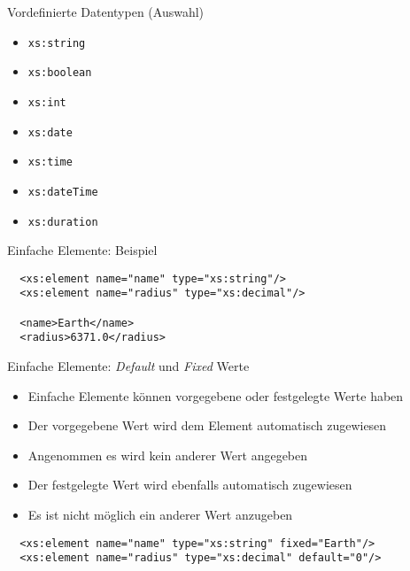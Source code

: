 \documentclass{beamer}
\begin{document}
\begin{frame}{Vordefinierte Datentypen (Auswahl)}
	
	\begin{itemize}
		\item \texttt{xs:string}
		\item \texttt{xs:boolean}
		\item \texttt{xs:int}
		\item \texttt{xs:date}
		\item \texttt{xs:time}
		\item \texttt{xs:dateTime}
		\item \texttt{xs:duration}
	\end{itemize}
	
\end{frame}

\begin{frame}[fragile]{Einfache Elemente: Beispiel}
	
	\lstset{language=XML}
	\begin{lstlisting}	
  <xs:element name="name" type="xs:string"/>
  <xs:element name="radius" type="xs:decimal"/>
  
  <name>Earth</name>
  <radius>6371.0</radius>
	\end{lstlisting}
	
\end{frame}

\begin{frame}[fragile]{Einfache Elemente: \emph{Default} und \emph{Fixed} Werte}
	
	\begin{itemize}
		\item Einfache Elemente können vorgegebene oder festgelegte Werte haben
		\item Der vorgegebene Wert wird dem Element automatisch zugewiesen
		\item Angenommen es wird kein anderer Wert angegeben
		\item Der festgelegte Wert wird ebenfalls automatisch zugewiesen
		\item Es ist nicht möglich ein anderer Wert anzugeben
	\end{itemize}
		
	\lstset{language=XML}
	\begin{lstlisting}	
  <xs:element name="name" type="xs:string" fixed="Earth"/>
  <xs:element name="radius" type="xs:decimal" default="0"/>
	\end{lstlisting}
	
\end{frame}
\end{document}

